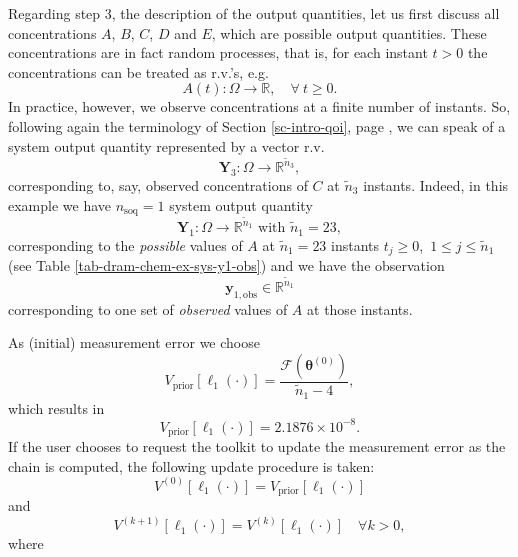 Regarding step 3, the description of the output quantities, let us first discuss all concentrations $A$, $B$, $C$, $D$ and $E$, which are possible output quantities.
These concentrations are in fact random processes, that is, for each instant $t>0$ the concentrations can be treated as r.v.'s, e.g.
\begin{equation*}
A(t):\Omega\rightarrow\mathbb{R},\quad\forall~t\geqslant 0.
\end{equation*}
In practice, however, we observe concentrations at a finite number of instants.
So, following again the terminology of Section \ref{sc-intro-qoi}, page \pageref{sc-intro-qoi}, we can speak of a system output quantity
represented by a vector r.v. 
\begin{equation*}
\mathbf{Y}_3:\Omega\rightarrow\mathbb{R}^{{\tilde{n}}_3},
\end{equation*}
corresponding to, say, observed concentrations of $C$ at ${\tilde{n}}_3$ instants.
Indeed, in this example we have
$n_{\text{soq}}=1$ system output quantity
\begin{equation*}
\mathbf{Y}_1:\Omega\rightarrow\mathbb{R}^{{\tilde{n}}_1}\text{ with }{\tilde{n}}_1=23,
\end{equation*}
corresponding to the {\it possible} values of $A$ at ${\tilde{n}}_1=23$ instants $t_j\geqslant 0$,~$1\leqslant j\leqslant {\tilde{n}}_1$ (see Table \ref{tab-dram-chem-ex-sys-y1-obs})
and we have the observation 
\begin{equation*}
\mathbf{y}_{1,\text{obs}}\in\mathbb{R}^{{\tilde{n}}_1}
\end{equation*}
corresponding to one set of {\it observed} values of $A$ at those instants.

As (initial) measurement error we choose
\begin{equation*}
V_{\text{prior}}[\ell_1(\cdot)] = \frac{\mathcal{F}(\boldsymbol{\theta}^{(0)})}{{\tilde{n}}_1-4},
\end{equation*}
which results in
\begin{equation*}
V_{\text{prior}}[\ell_1(\cdot)] = 2.1876\times 10^{-8}.
\end{equation*}
If the user chooses to request the toolkit to update the measurement error as the chain is computed, the following update procedure is taken:
\begin{equation*}
V^{(0)}[\ell_1(\cdot)] = V_{\text{prior}}[\ell_1(\cdot)]
\end{equation*}
and
\begin{equation*}
V^{(k+1)}[\ell_1(\cdot)] = V^{(k)}[\ell_1(\cdot)]\quad\forall k>0,
\end{equation*}
where

